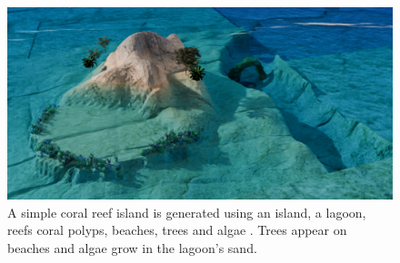 \begin{figure}[H]
    \includegraphics{multiScene1 v2 final 1.png}
    \caption{A simple coral reef island is generated using an island, a lagoon, reefs coral polyps, beaches, trees and algae . Trees appear on beaches and algae grow in the lagoon's sand. }
    \label{fig:env-obj-coral-island-scene}
\end{figure}










































